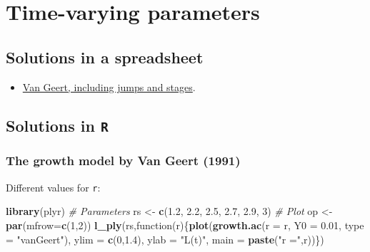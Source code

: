\documentclass[]{book}
\newenvironment{Shaded}{\begin{snugshade}}{\end{snugshade}}
\newcommand{\KeywordTok}[1]{\textcolor[rgb]{0.13,0.29,0.53}{\textbf{{#1}}}}
\newcommand{\DataTypeTok}[1]{\textcolor[rgb]{0.13,0.29,0.53}{{#1}}}
\newcommand{\DecValTok}[1]{\textcolor[rgb]{0.00,0.00,0.81}{{#1}}}
\newcommand{\FloatTok}[1]{\textcolor[rgb]{0.00,0.00,0.81}{{#1}}}
\newcommand{\StringTok}[1]{\textcolor[rgb]{0.31,0.60,0.02}{{#1}}}
\newcommand{\CommentTok}[1]{\textcolor[rgb]{0.56,0.35,0.01}{\textit{{#1}}}}
\newcommand{\NormalTok}[1]{{#1}}
\providecommand{\tightlist}{%
  \setlength{\itemsep}{0pt}\setlength{\parskip}{0pt}}
\let\stdsection\section
\renewcommand\section{\newpage\stdsection}
\begin{document}
\section{\texorpdfstring{\textbf{Time-varying
parameters}}{Time-varying parameters}}\label{time-varying-parameters}

\subsection*{Solutions in a
spreadsheet}\label{solutions-in-a-spreadsheet-1}

\begin{itemize}
\tightlist
\item
  \href{https://docs.google.com/spreadsheets/d/1DAg0u-zMFOIvRSDOZDxqnzyS0HQJg4FIXzJIMvEMwiI/edit?usp=sharing}{Van
  Geert, including jumps and stages}.
\end{itemize}

\subsection{\texorpdfstring{Solutions in
\texttt{R}}{Solutions in R}}\label{solutions-in-r-1}

\subsubsection*{The growth model by Van Geert
(1991)}\label{the-growth-model-by-van-geert-1991-1}

Different values for \texttt{r}:

\begin{Shaded}
\begin{Highlighting}[]
\KeywordTok{library}\NormalTok{(plyr)}
\CommentTok{# Parameters}
\NormalTok{rs <-}\StringTok{ }\KeywordTok{c}\NormalTok{(}\FloatTok{1.2}\NormalTok{, }\FloatTok{2.2}\NormalTok{, }\FloatTok{2.5}\NormalTok{, }\FloatTok{2.7}\NormalTok{, }\FloatTok{2.9}\NormalTok{, }\DecValTok{3}\NormalTok{)}
\CommentTok{# Plot }
\NormalTok{op <-}\StringTok{ }\KeywordTok{par}\NormalTok{(}\DataTypeTok{mfrow=}\KeywordTok{c}\NormalTok{(}\DecValTok{1}\NormalTok{,}\DecValTok{2}\NormalTok{))}
\KeywordTok{l_ply}\NormalTok{(rs,function(r)\{}\KeywordTok{plot}\NormalTok{(}\KeywordTok{growth.ac}\NormalTok{(}\DataTypeTok{r =} \NormalTok{r,  }\DataTypeTok{Y0 =} \FloatTok{0.01}\NormalTok{, }\DataTypeTok{type =} \StringTok{"vanGeert"}\NormalTok{),}
                          \DataTypeTok{ylim =} \KeywordTok{c}\NormalTok{(}\DecValTok{0}\NormalTok{,}\FloatTok{1.4}\NormalTok{), }\DataTypeTok{ylab =} \StringTok{"L(t)"}\NormalTok{, }\DataTypeTok{main =} \KeywordTok{paste}\NormalTok{(}\StringTok{"r ="}\NormalTok{,r))\})}
\end{Highlighting}
\end{Shaded}
\end{document}
